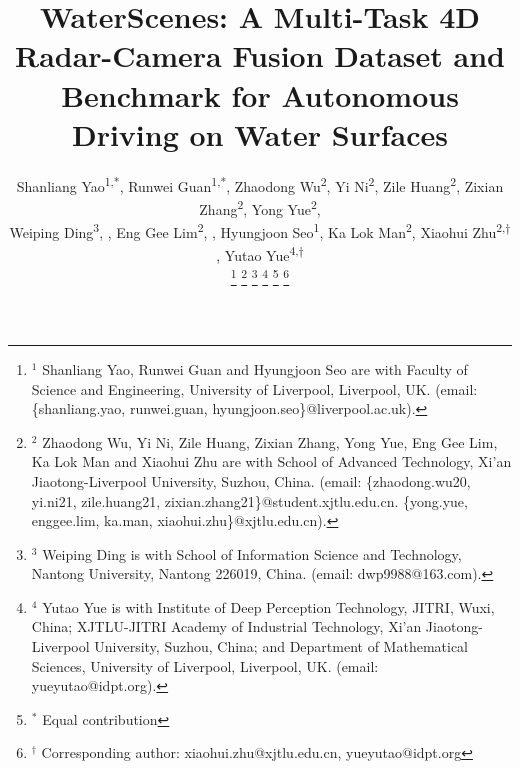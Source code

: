 \documentclass[lettersize,journal]{IEEEtran}
\begin{document}
\title{WaterScenes: A Multi-Task 4D Radar-Camera Fusion Dataset and Benchmark for Autonomous Driving on Water Surfaces}

\author{
Shanliang Yao\textsuperscript{1,*}, Runwei Guan\textsuperscript{1,*}, Zhaodong Wu\textsuperscript{2}, Yi Ni\textsuperscript{2}, Zile Huang\textsuperscript{2}, Zixian Zhang\textsuperscript{2}, Yong Yue\textsuperscript{2}, \\ Weiping Ding\textsuperscript{3}, , Eng Gee Lim\textsuperscript{2}, , Hyungjoon Seo\textsuperscript{1}, Ka Lok Man\textsuperscript{2}, Xiaohui Zhu\textsuperscript{2,$\dagger$}, Yutao Yue\textsuperscript{4,$\dagger$}


\thanks{$^{\text{1}}$ Shanliang Yao, Runwei Guan and Hyungjoon Seo are with Faculty of Science and Engineering, University of Liverpool, Liverpool, UK. (email: \{shanliang.yao, runwei.guan, hyungjoon.seo\}@liverpool.ac.uk).}
\thanks{$^{\text{2}}$ Zhaodong Wu, Yi Ni, Zile Huang, Zixian Zhang, Yong Yue, Eng Gee Lim, Ka Lok Man and Xiaohui Zhu are with School of Advanced Technology, Xi'an Jiaotong-Liverpool University, Suzhou, China. (email: \{zhaodong.wu20, yi.ni21, zile.huang21, zixian.zhang21\}@student.xjtlu.edu.cn. \{yong.yue, enggee.lim, ka.man, xiaohui.zhu\}@xjtlu.edu.cn).}
\thanks{$^{\text{3}}$ Weiping Ding is with School of Information Science and Technology, Nantong University, Nantong 226019, China. (email: dwp9988@163.com).}
\thanks{$^{\text{4}}$ Yutao Yue is with Institute of Deep Perception Technology, JITRI, Wuxi, China; XJTLU-JITRI Academy of Industrial Technology, Xi'an Jiaotong-Liverpool University, Suzhou, China; and Department of Mathematical Sciences, University of Liverpool, Liverpool, UK. (email: yueyutao@idpt.org).}
\thanks{$^{\text{*}}$ Equal contribution}
\thanks{$^{\dagger}$ Corresponding author: xiaohui.zhu@xjtlu.edu.cn, yueyutao@idpt.org}
}


\maketitle
\end{document}
